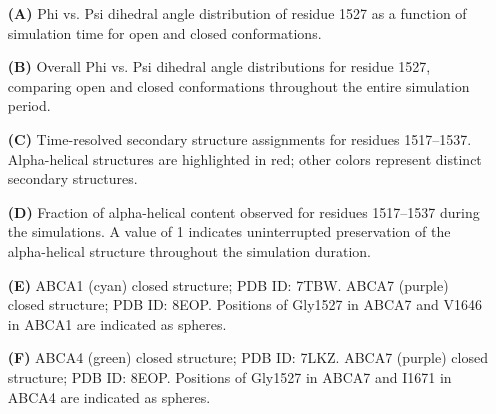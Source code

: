     \begin{itemize}
        \item[\textbf{(A)}] Phi vs. Psi dihedral angle distribution of residue 1527 as a function of simulation time for open and closed conformations.
        \item[\textbf{(B)}] Overall Phi vs. Psi dihedral angle distributions for residue 1527, comparing open and closed conformations throughout the entire simulation period.
        \item[\textbf{(C)}] Time-resolved secondary structure assignments for residues 1517–1537. Alpha-helical structures are highlighted in red; other colors represent distinct secondary structures.
        \item[\textbf{(D)}] Fraction of alpha-helical content observed for residues 1517–1537 during the simulations. A value of 1 indicates uninterrupted preservation of the alpha-helical structure throughout the simulation duration.
        \item[\textbf{(E)}] ABCA1 (cyan) closed structure; PDB ID: 7TBW. ABCA7 (purple) closed structure; PDB ID: 8EOP. Positions of Gly1527 in ABCA7 and V1646 in ABCA1 are indicated as spheres.
        \item[\textbf{(F)}] ABCA4 (green) closed structure; PDB ID: 7LKZ. ABCA7 (purple) closed structure; PDB ID: 8EOP. Positions of Gly1527 in ABCA7 and I1671 in ABCA4 are indicated as spheres.

    \end{itemize}

